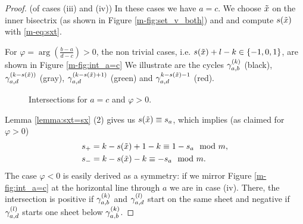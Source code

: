 \documentclass[main.tex]{subfiles}
\begin{document}
 \begin{proof}(of cases (iii) and  (iv))
 In these cases we have $a = c$. We choose $\tilde{x}$ on the inner bisectrix (as shown in Figure \ref{m-fig:set_v_both}) and
   and compute $s(\tilde{x})$ with \eqref{m-eq:sxt}.

 For $\varphi = \arg\left(\frac{b-a}{d-c}\right) > 0$, the non trivial cases, i.e. $s(\tilde{x}) + l - k \in \{-1,0,1\}$, are shown in Figure \ref{m-fig:int_a=c}
  We illustrate are the cycles $\gamma_{a,b}^{(k)}$ (black), $\gamma_{a,d}^{(k-s(\tilde{x}))}$ (gray), $\gamma_{a,d}^{(k-s(\tilde{x}) + 1)}$ (green) and
    $\gamma_{a,d}^{k-s(\tilde{x})-1}$ (red).
  \begin{figure}[H]
      \begin{center}
   \scalebox{0.8}{}
      \end{center}
    \caption{Intersections for $a=c$ and $\varphi > 0$.}
    \label{fig:int_a=c}
   \end{figure}
   Lemma \ref{lemma:sxt=sx} (2) gives us $s(\tilde{x}) \equiv s_a$, which implies (as claimed for $\varphi > 0$)
    \begin{align*}
    & s_+ = k-s(\tilde{x})+1-k \equiv 1-s_a \mod m, \\
    & s_- = k-s(\tilde{x})-k \equiv -s_a \mod m.
    \end{align*}
  The case $\varphi < 0$ is easily derived as a symmetry: if we mirror Figure \ref{m-fig:int_a=c} at the horizontal line through $a$ we are in case (iv).
  There, the intersection is positive if $\gamma_{a,b}^{(k)}$ and $\gamma_{a,d}^{(l)}$ start on the same sheet and negative if $\gamma_{a,d}^{(l)}$ starts one sheet below $\gamma_{a,b}^{(k)}$.
  \end{proof}
\end{document}
